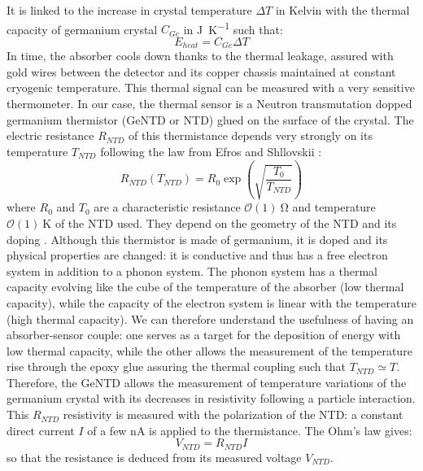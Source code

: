 It is linked to the increase in crystal temperature $\Delta T$ in Kelvin with the thermal capacity of germanium crystal $C_{Ge}$ in \si{\joule\per\kelvin} such that:
\begin{equation}
E_{heat} = C_{Ge} \Delta T
\end{equation}
In time, the absorber cools down thanks to the thermal leakage, assured with gold wires between the detector and its copper chassis maintained at constant cryogenic temperature.
This thermal signal can be measured with a very sensitive thermometer. In our case, the thermal sensor is a Neutron transmutation dopped germanium thermistor (GeNTD or NTD) glued on the surface of the crystal. The electric resistance $R_{NTD}$ of this thermistance depends very strongly on its temperature $T_{NTD}$ following the law from Efros and Shllovskii \cite{Mathimalar:2014sfa}:
\begin{equation}
\label{eq:ntd-resistivity}
R_{NTD}(T_{NTD}) = R_0 \exp(\sqrt{\frac{T_0}{T_{NTD}}})
\end{equation}
where $R_0$ and $T_0$ are a characteristic resistance $\mathcal{O}(1)\ \si{\ohm}$ and temperature $\mathcal{O}(1)\ \si{\kelvin}$ of the NTD used. They depend on the geometry of the NTD and its doping \cite{Mathimalar:2014sfa}. 
Although this thermistor is made of germanium, it is doped and its physical properties are changed: it is conductive and thus has a free electron system in addition to a phonon system. The phonon system has a thermal capacity evolving like the cube of the temperature of the absorber (low thermal capacity), while the capacity of the electron system is linear with the temperature (high thermal capacity). We can therefore understand the usefulness of having an absorber-sensor couple: one serves as a target for the deposition of energy with low thermal capacity, while the other allows the measurement of the temperature rise through the epoxy glue assuring the thermal coupling such that $T_{NTD} \simeq T$.
Therefore, the GeNTD allows the measurement of temperature variations of the germanium crystal with its decreases in resistivity following a particle interaction.
This $R_{NTD}$ resistivity is measured with the polarization of the NTD: a constant direct current $I$ of a few \si{\nano\ampere} is applied to the  thermistance. The Ohm's law gives:
\begin{equation}
\label{eq:ohm-law}
V_{NTD} = R_{NTD} I
\end{equation}
so that the resistance is deduced from its measured voltage $V_{NTD}$.

